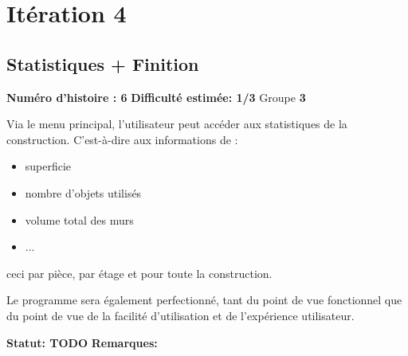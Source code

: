 \documentclass[a4paper]{article} \usepackage{framed} \usepackage{fullpage} \usepackage[french]{babel} \usepackage[utf8]{inputenc} \usepackage[T1]{fontenc}
\begin{document}
\section{Itération 4}
\begin{framed}
\subsection{Statistiques + Finition}

\textbf{Numéro d'histoire : 6}  
\textbf{Difficulté estimée: 1/3}  Groupe \textbf{3}

Via le menu principal, l’utilisateur peut accéder aux statistiques de la construction. C’est-à-dire aux informations de :
\begin{itemize}
\item superficie
\item nombre d’objets utilisés
\item volume total des murs
\item ...
\end{itemize}
ceci par pièce, par étage et pour toute la construction.

Le programme sera également perfectionné, tant du point de vue fonctionnel que du point de vue de la facilité d'utilisation et de l'expérience utilisateur.

\textbf{Statut: TODO}  \textbf{Remarques:}
\end{framed}
\end{document}
